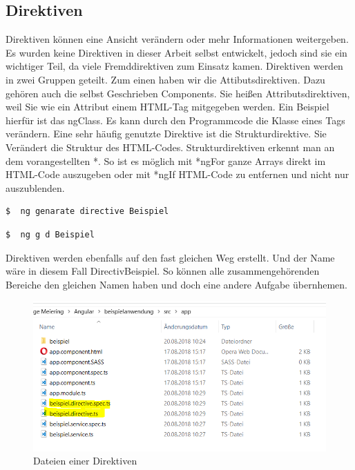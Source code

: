 \subsection{Direktiven}
Direktiven können eine Ansicht verändern oder mehr Informationen weitergeben. Es wurden keine Direktiven in dieser Arbeit selbst entwickelt, jedoch sind sie ein wichtiger Teil, da viele Fremddirektiven zum Einsatz kamen. Direktiven werden in zwei Gruppen geteilt. Zum einen haben wir die Attibutsdirektiven. Dazu gehören auch die selbst Geschrieben Components. Sie heißen Attributsdirektiven, weil Sie wie ein Attribut einem \ac{HTML}-Tag mitgegeben werden. Ein Beispiel hierfür ist das ngClass. Es kann durch den Programmcode die Klasse eines Tags verändern. Eine sehr häufig genutzte Direktive ist die Strukturdirektive. Sie Verändert die Struktur des \ac{HTML}-Codes. Strukturdirektiven erkennt man an dem vorangestellten *. So ist es möglich mit *ngFor ganze Arrays direkt im \ac{HTML}-Code auszugeben oder mit *ngIf \ac{HTML}-Code zu entfernen und nicht nur auszublenden. \autocite{Clow.2018}

\begin{lstlisting}[language=sh, frame=single]
$  ng genarate directive Beispiel
\end{lstlisting} 

\begin{lstlisting}[language=sh, frame=single]
$  ng g d Beispiel
\end{lstlisting}

Direktiven werden ebenfalls auf den fast gleichen Weg erstellt. Und der Name wäre in diesem Fall DirectivBeispiel. So können alle zusammengehörenden Bereiche den gleichen Namen haben und doch eine andere Aufgabe übernhemen.

\begin{figure}[H]
	\centering
	\includegraphics[scale=0.9]{content/pictures/directive.png}
	\caption{ Dateien einer Direktiven}
	\label{fig:directive}
\end{figure}


